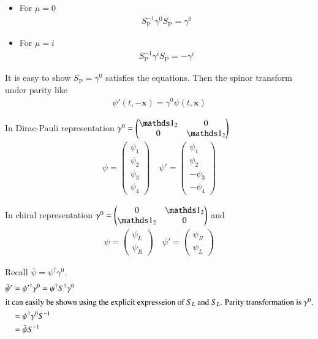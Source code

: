 \begin{itemize}
   \item For $\mu = 0$ 
      \begin{align*}
S^{-1}_\text{P} \gamma^0 S_\text{P} = \gamma^0
      \end{align*}
   \item For $\mu=i$
      \begin{align*}
S^{-1}_\text{P} \gamma^i S_\text{P} = -\gamma^i
      \end{align*}
\end{itemize}

It is easy to show $S_\text{P} = \gamma^0$ satisfies the equations. Then the spinor transform under parity like
\begin{align}
   \psi'(t, -\pmb{x}) = \gamma^0 \psi(t,\pmb{x})
\end{align}

In Dirac-Pauli representation $\gamma^0 = \begin{pmatrix} \id_2 & 0 \\ 0 & \id_2 \end{pmatrix}$
\begin{align*}
   \psi = \begin{pmatrix} \psi_1 \\ \psi_2 \\ \psi_3 \\ \psi_4 \end{pmatrix} \quad
   \psi' = \begin{pmatrix} \psi_1 \\ \psi_2 \\ -\psi_3 \\ -\psi_4 \end{pmatrix} 
\end{align*}

In chiral representation $\gamma^0 = \begin{pmatrix} 0 & \id_2 \\ \id_2 & 0 \end{pmatrix}$ and 
\begin{align*}
\psi = \begin{pmatrix} \psi_L \\ \psi_R\end{pmatrix} \quad
\psi' = \begin{pmatrix} \psi_R \\ \psi_L \end{pmatrix}
\end{align*}

Recall $\bar{\psi} = \psi^\dagger \gamma^0$. 
\begin{align*}
   \bar{\psi}' &= \psi'^\dagger \gamma^0 = \psi^\dagger S^\dagger \gamma^0 \\
   \shortintertext{it can easily be shown using the explicit expresseion of $S_L$ and $S_L$. Parity transformation is $\gamma^0$.}
               &= \psi^\dagger \gamma^0 S^{-1} \\
               &= \bar{\psi} S^{-1}
\end{align*}

